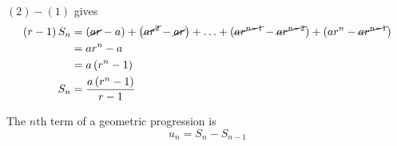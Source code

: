 \documentclass[11pt,a4paper]{book}
\begin{document}
$\left(2\right)-\left(1\right)$ gives 
\begin{align*}
\left(r-1\right)S_{n} & =\left(\cancel{ar}-a\right)+\left(\cancel{ar^{2}}-\cancel{ar}\right)+\ldots+\left(\cancel{ar^{n-1}}-\cancel{ar^{n-2}}\right)+\left(ar^{n}-\cancel{ar^{n-1}}\right)\\
 & =ar^{n}-a\\
 & =a\left(r^{n}-1\right)\\
S_{n} & =\frac{a\left(r^{n}-1\right)}{r-1}
\end{align*}

\begin{tcolorbox}[colback=blue!5, colframe=black,boxrule=.4pt, sharpish corners]

The $n\text{th}$ term of a geometric progression is 
\[
u_{n}=S_{n}-S_{n-1}
\]
\end{tcolorbox}
\end{document}
